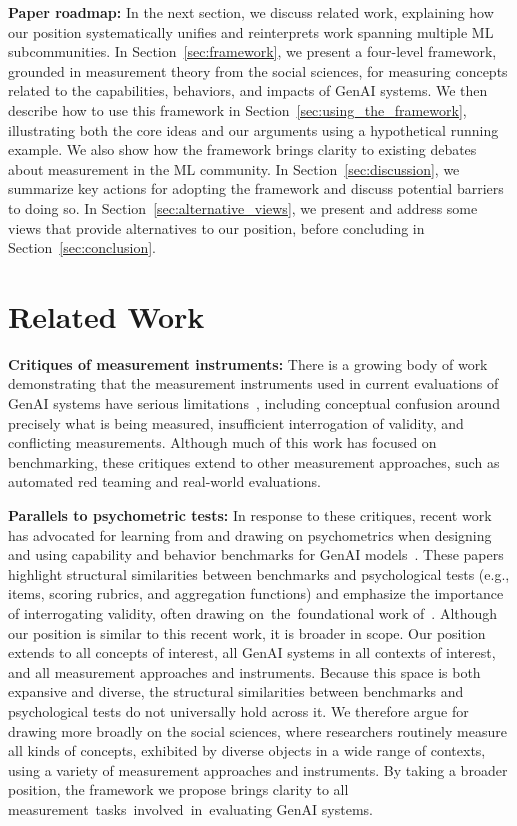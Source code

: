 \documentclass{article}
\begin{document}
\textbf{Paper roadmap:} In 
the next section, we discuss related work, explaining how our position systematically unifies and reinterprets work spanning multiple ML subcommunities. In Section~\ref{sec:framework}, we present a four-level framework,
grounded in measurement theory from the social
sciences, for measuring concepts related to the
capabilities, behaviors, and impacts of GenAI systems. We then describe how to use this framework in Section~\ref{sec:using_the_framework}, illustrating both the core ideas and our arguments using a hypothetical running example. We also show how the framework brings clarity to existing debates about measurement in the ML community. In Section~\ref{sec:discussion}, we summarize key actions for adopting the framework and discuss potential barriers to doing so. In Section~\ref{sec:alternative_views}, we present and address some views that
provide alternatives to our position, before concluding in Section~\ref{sec:conclusion}.

\section{Related Work}
\label{sec:related_work}

\textbf{Critiques of measurement instruments:} There is a growing body of work demonstrating that the measurement instruments used in current evaluations of GenAI systems have serious limitations~\citep[e.g.,][]{raji2021widebenchmark,hutchinson2022evaluationgaps, rauh2024gaps, roose2024ai, eriksson2025can, brandom2025}, including conceptual confusion around precisely what is being measured, insufficient interrogation of validity, and conflicting measurements. Although much of this work has focused on benchmarking, these critiques extend to other measurement approaches, such as automated red teaming and real-world evaluations.

\textbf{Parallels to psychometric tests:} In response to these critiques, recent work has advocated for learning from and drawing on psychometrics when designing and using capability and behavior benchmarks for GenAI models~\citep[e.g.,][]{wang23evaluating, alaa25medical, salaudeen25measurement}. These papers highlight structural similarities between benchmarks and psychological tests (e.g., items, scoring rubrics, and aggregation functions) and emphasize the importance of interrogating validity, often drawing on~the~foundational work of~\citet{cronbach1955construct}. Although our position is similar to this recent work, it is broader in scope. Our position extends to all concepts of interest, all GenAI systems in all contexts of interest, and all measurement approaches and instruments. Because this space is both expansive and diverse, the structural similarities between benchmarks and psychological tests do not universally hold across it. We therefore argue for drawing more broadly on the social sciences, where researchers routinely measure all kinds of concepts, exhibited by diverse objects in a wide range of contexts, using a variety of measurement approaches and instruments. By taking a broader position, the framework we propose brings clarity to all measurement~tasks~involved~in~evaluating GenAI systems.
\end{document}
